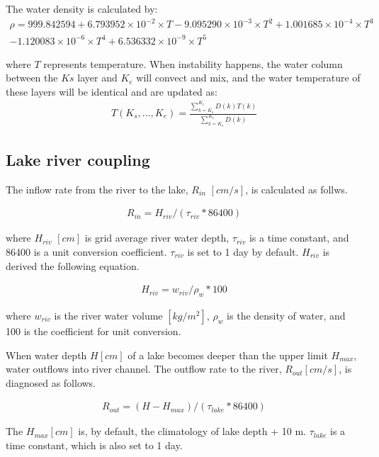 The water density is calculated by: \begin{eqnarray}
\rho =999.842594+6.793952\times 10^{-2}\times T-9.095290\times 10^{-3}\times T^{2}+1.001685\times
      10^{-4}\times T^{3}\\ -1.120083\times 10^{-6}\times T^{4}+6.536332\times 10^{-9}\times T^{5}
\end{eqnarray}

where \(T\) represents temperature. When instability happens, the water column between the \(Ks\) layer and \(K_{e}\) will convect and mix, and the water temperature of these layers will be identical
and are updated as: \begin{eqnarray}
T(K_{s}, ..., K_{e})=\frac{\sum_{k=K_{s}}^{K_{e}}D(k)T(k)}{\sum_{k=K_{s}}^{K_{e}}D(k)}
\end{eqnarray}

\subsection{Lake river coupling}\label{lake-river-coupling}

The inflow rate from the river to the lake, \(R_{in}\) \([cm/s]\), is calculated as follws.

\begin{eqnarray}
    R_{in} = H_{riv} / (\tau_{riv} * 86400)
\end{eqnarray}

where \(H_{riv}\) \([cm]\) is grid average river water depth, \(\tau_{riv}\) is a time constant, and 86400 is a unit conversion coefficient. \(\tau_{riv}\) is set to 1 day by default. \(H_{riv}\) is
derived the following equation.

\begin{eqnarray}
    H_{riv} = w_{riv} / \rho_w * 100
\end{eqnarray}

where \(w_{riv}\) is the river water volume \([kg/m^2]\), \(\rho_w\) is the density of water, and 100 is the coefficient for unit conversion.

When water depth \(H [cm]\) of a lake becomes deeper than the upper limit \(H_{max}\), water outflows into river channel. The outflow rate to the river, \(R_{out} [cm/s]\), is diagnosed as follows.

\begin{eqnarray}
    R_{out} = (H - H_{max}) / ( \tau_{lake} * 86400 )
\end{eqnarray}

The \(H_{max} [cm]\) is, by default, the climatology of lake depth + 10 m. \(\tau_{lake}\) is a time constant, which is also set to 1 day.

